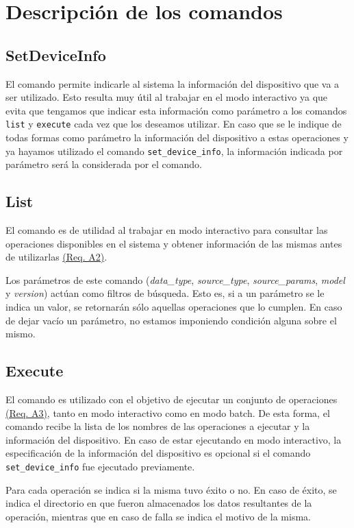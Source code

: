 \section{Descripción de los comandos}
\subsection*{SetDeviceInfo}
El comando permite indicarle al sistema la información del dispositivo que va a ser utilizado. Esto resulta muy útil al trabajar en el modo interactivo ya que evita que tengamos que indicar esta información como parámetro a los comandos \texttt{list} y \texttt{execute} cada vez que los deseamos utilizar. En caso que se le indique de todas formas como parámetro la información del dispositivo a estas operaciones y ya hayamos utilizado el comando \texttt{set\_device\_info}, la información indicada por parámetro será la considerada por el comando.

\subsection*{List}
El comando es de utilidad al trabajar en modo interactivo para consultar las operaciones disponibles en el sistema y obtener información de las mismas antes de utilizarlas \hyperref[reqA2]{(Req. A2)}.

Los parámetros de este comando (\emph{data\_type}, \emph{source\_type}, \emph{source\_params}, \emph{model} y \emph{version}) actúan como filtros de búsqueda. Esto es, si a un parámetro se le indica un valor, se retornarán sólo aquellas operaciones que lo cumplen. En caso de dejar vacío un parámetro, no estamos imponiendo condición alguna sobre el mismo.

\subsection*{Execute}
El comando es utilizado con el objetivo de ejecutar un conjunto de operaciones \hyperref[reqA3]{(Req. A3)}, tanto en modo interactivo como en modo batch. De esta forma, el comando recibe la lista de los nombres de las operaciones a ejecutar y la información del dispositivo. En caso de estar ejecutando en modo interactivo, la especificación de la información del dispositivo es opcional si el comando \texttt{set\_device\_info} fue ejecutado previamente.

Para cada operación se indica si la misma tuvo éxito o no. En caso de éxito, se indica el directorio en que fueron almacenados los datos resultantes de la operación, mientras que en caso de falla se indica el motivo de la misma.

